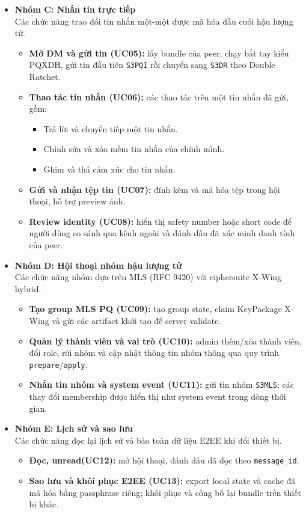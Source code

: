 \begin{itemize}
  \item \textbf{Nhóm C: Nhắn tin trực tiếp}\\
  Các chức năng trao đổi tin nhắn một-một được mã hóa đầu cuối hậu lượng tử.
  \begin{itemize}
    \item \textbf{Mở DM và gửi tin (UC05):} lấy bundle của peer, chạy bắt tay kiểu PQXDH, gửi tin đầu tiên \texttt{S3PQI} rồi chuyển sang \texttt{S3DR} theo Double Ratchet.
    \item \textbf{Thao tác tin nhắn (UC06):} các thao tác trên một tin nhắn đã gửi, gồm:
      \begin{itemize}
        \item Trả lời và chuyển tiếp một tin nhắn.
        \item Chỉnh sửa và xóa mềm tin nhắn của chính mình.
        \item Ghim và thả cảm xúc cho tin nhắn.
      \end{itemize}
    \item \textbf{Gửi và nhận tệp tin (UC07):} đính kèm và mã hóa tệp trong hội thoại, hỗ trợ preview ảnh.
    \item \textbf{Review identity (UC08):} hiển thị safety number hoặc short code để người dùng so sánh qua kênh ngoài và đánh dấu đã xác minh danh tính của peer.
  \end{itemize}

  \item \textbf{Nhóm D: Hội thoại nhóm hậu lượng tử}\\
  Các chức năng nhóm dựa trên MLS (RFC 9420) với ciphersuite X-Wing hybrid.
  \begin{itemize}
    \item \textbf{Tạo group MLS PQ (UC09):} tạo group state, claim KeyPackage X-Wing và gửi các artifact khởi tạo để server validate.
    \item \textbf{Quản lý thành viên và vai trò (UC10):} admin thêm/xóa thành viên, đổi role, rời nhóm và cập nhật thông tin nhóm thông qua quy trình \texttt{prepare}/\texttt{apply}.
    \item \textbf{Nhắn tin nhóm và system event (UC11):} gửi tin nhóm \texttt{S3MLS}; các thay đổi membership được hiển thị như system event trong dòng thời gian.
  \end{itemize}

  \item \textbf{Nhóm E: Lịch sử và sao lưu}\\
  Các chức năng đọc lại lịch sử và bảo toàn dữ liệu E2EE khi đổi thiết bị.
  \begin{itemize}
    \item \textbf{Đọc, unread(UC12):} mở hội thoại, đánh dấu đã đọc theo \texttt{message\_id}.
    \item \textbf{Sao lưu và khôi phục E2EE (UC13):} export local state và cache đã mã hóa bằng passphrase riêng; khôi phục và công bố lại bundle trên thiết bị khác.
  \end{itemize}


\end{itemize}
